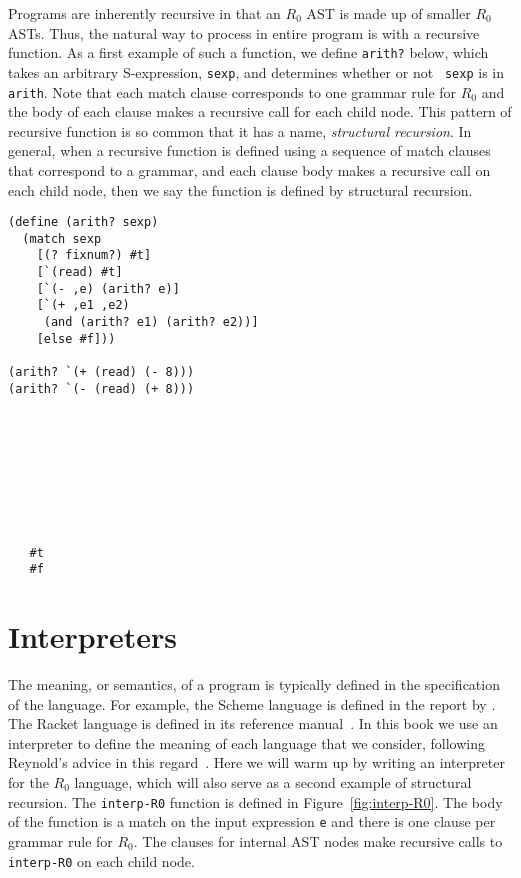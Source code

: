 \documentclass[11pt]{book}
\begin{document}
Programs are inherently recursive in that an $R_0$ AST is made
up of smaller $R_0$ ASTs. Thus, the natural way to process in
entire program is with a recursive function.  As a first example of
such a function, we define \texttt{arith?} below, which takes an
arbitrary S-expression, {\tt sexp}, and determines whether or not {\tt
  sexp} is in {\tt arith}. Note that each match clause corresponds to
one grammar rule for $R_0$ and the body of each clause makes a
recursive call for each child node. This pattern of recursive function
is so common that it has a name, \emph{structural recursion}.  In
general, when a recursive function is defined using a sequence of
match clauses that correspond to a grammar, and each clause body makes
a recursive call on each child node, then we say the function is
defined by structural recursion.
\begin{center}
\begin{minipage}{0.7\textwidth}
\begin{lstlisting}
(define (arith? sexp)
  (match sexp
    [(? fixnum?) #t]
    [`(read) #t]
    [`(- ,e) (arith? e)]
    [`(+ ,e1 ,e2)
     (and (arith? e1) (arith? e2))]
    [else #f]))

(arith? `(+ (read) (- 8)))
(arith? `(- (read) (+ 8)))
\end{lstlisting}
\end{minipage}
\vrule
\begin{minipage}{0.25\textwidth}
\begin{lstlisting}








   #t
   #f
\end{lstlisting}
\end{minipage}
\end{center}



\section{Interpreters}
\label{sec:interp-R0}

The meaning, or semantics, of a program is typically defined in the
specification of the language. For example, the Scheme language is
defined in the report by \cite{SPERBER:2009aa}. The Racket language is
defined in its reference manual~\citep{plt-tr}. In this book we use an
interpreter to define the meaning of each language that we consider,
following Reynold's advice in this
regard~\citep{reynolds72:_def_interp}. Here we will warm up by writing
an interpreter for the $R_0$ language, which will also serve
as a second example of structural recursion. The \texttt{interp-R0}
function is defined in Figure~\ref{fig:interp-R0}. The body of the
function is a match on the input expression \texttt{e} and there is
one clause per grammar rule for $R_0$. The clauses for
internal AST nodes make recursive calls to \texttt{interp-R0} on
each child node.
\end{document}

